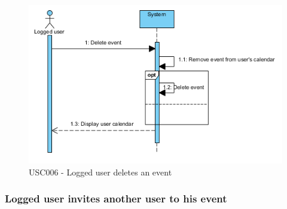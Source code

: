 \documentclass[10pt,a4paper,titlepage]{article}
\begin{document}
\begin{figure}[h]
\centering
\includegraphics[width=\linewidth]{./Sequence_diag/USC006.png}
\caption[USC006]{USC006 - Logged user deletes an event}
\label{fig:USC006}
\end{figure}

\clearpage
\subsubsection{Logged user invites another user to his event}
\end{document}
